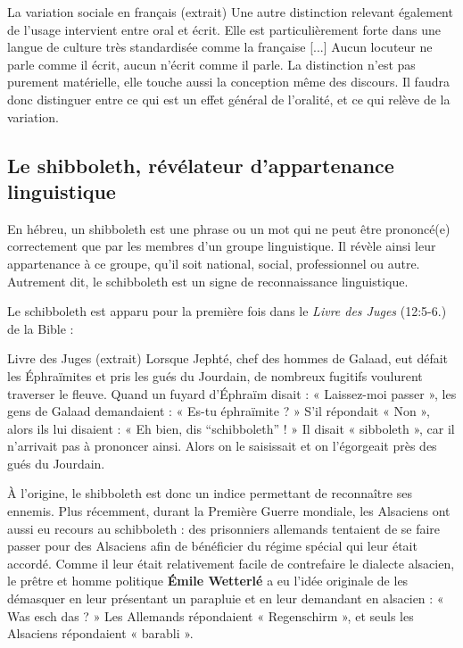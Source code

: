 \begin{lecture}{La variation sociale en français (extrait)}
Une autre distinction relevant également de l’usage intervient entre oral et écrit. Elle est particulièrement forte dans une langue de culture très standardisée comme la française [...] Aucun locuteur ne parle comme il écrit, aucun n’écrit comme il parle. La distinction n’est pas purement matérielle, elle touche aussi la conception même des discours. Il faudra donc distinguer entre ce qui est un effet général de l’oralité, et ce qui relève de la variation.
\end{lecture}

\subsection{Le shibboleth, révélateur d’appartenance linguistique}
En hébreu, un shibboleth est une phrase ou un mot qui ne peut être prononcé(e) correctement que par les membres d’un groupe linguistique. Il révèle ainsi leur appartenance à ce groupe, qu’il soit national, social, professionnel ou autre. Autrement dit, le schibboleth est un signe de reconnaissance linguistique.

Le schibboleth est apparu pour la première fois dans le \textit{Livre des Juges} (12:5-6.) de la Bible :

\begin{lecture}{Livre des Juges (extrait)}
Lorsque Jephté, chef des hommes de Galaad, eut défait les Éphraïmites et pris les gués du Jourdain, de nombreux fugitifs voulurent traverser le fleuve. Quand un fuyard d’Éphraïm disait : « Laissez-moi passer », les gens de Galaad demandaient : « Es-tu éphraïmite ? » S’il répondait « Non », alors ils lui disaient : « Eh bien, dis “schibboleth” ! » Il disait « sibboleth », car il n’arrivait pas à prononcer ainsi. Alors on le saisissait et on l’égorgeait près des gués du Jourdain.
\end{lecture}

À l’origine, le shibboleth est donc un indice permettant de reconnaître ses ennemis. Plus récemment, durant la Première Guerre mondiale, les Alsaciens ont aussi eu recours au schibboleth :
des prisonniers allemands tentaient de se faire passer pour des Alsaciens afin de bénéficier du régime spécial qui leur était accordé. Comme il leur était relativement facile de contrefaire le dialecte alsacien, le prêtre et homme politique \textbf{Émile Wetterlé} a eu l’idée originale de les démasquer en leur présentant un parapluie et en leur demandant en alsacien : « Was esch das ? » Les Allemands répondaient « Regenschirm », et seuls les Alsaciens répondaient « barabli ».


